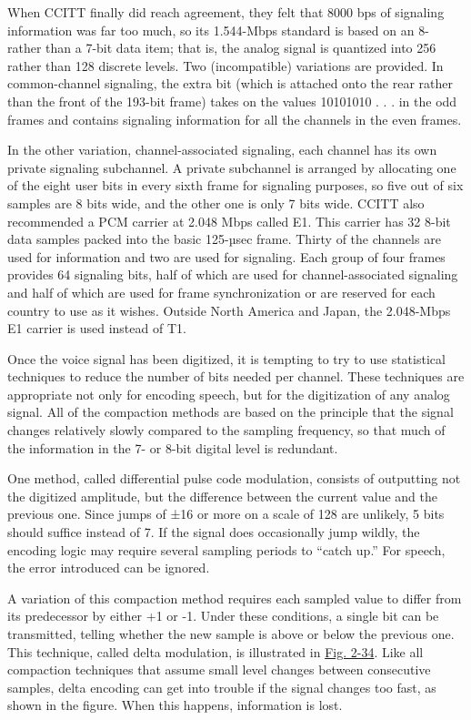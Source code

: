 When CCITT finally did reach agreement, they felt that 8000 bps of
signaling information was far too much, so its 1.544-Mbps standard is
based on an 8- rather than a 7-bit data item; that is, the analog signal
is quantized into 256 rather than 128 discrete levels. Two
(incompatible) variations are provided. In {common-channel signaling},
the extra bit (which is attached onto the rear rather than the front of
the 193-bit frame) takes on the values 10101010 . . . in the odd frames
and contains signaling information for all the channels in the even
frames.

In the other variation, {channel-associated signaling}, each channel has
its own private signaling subchannel. A private subchannel is arranged
by allocating one of the eight user bits in every sixth frame for
signaling purposes, so five out of six samples are 8 bits wide, and the
other one is only 7 bits wide. CCITT also recommended a PCM carrier at
2.048 Mbps called {E1}. This carrier has 32 8-bit data samples packed
into the basic 125{-}µsec frame. Thirty of the channels are used for
information and two are used for signaling. Each group of four frames
provides 64 signaling bits, half of which are used for
channel-associated signaling and half of which are used for frame
synchronization or are reserved for each country to use as it wishes.
Outside North America and Japan, the 2.048-Mbps E1 carrier is used
instead of T1.

Once the voice signal has been digitized, it is tempting to try to use
statistical techniques to reduce the number of bits needed per channel.
These techniques are appropriate not only for encoding speech, but for
the digitization of any analog signal. All of the compaction methods are
based on the principle that the signal changes relatively slowly
compared to the sampling frequency, so that much of the information in
the 7- or 8-bit digital level is redundant.

One method, called {differential pulse code modulation}, consists of
outputting not the digitized amplitude, but the difference between the
current value and the previous one. Since jumps of ±16 or more on a
scale of 128 are unlikely, 5 bits should suffice instead of 7. If the
signal does occasionally jump wildly, the encoding logic may require
several sampling periods to ``catch up.'' For speech, the error
introduced can be ignored.

A variation of this compaction method requires each sampled value to
differ from its predecessor by either +1 or -1. Under these conditions,
a single bit can be transmitted, telling whether the new sample is above
or below the previous one. This technique, called {delta modulation}, is
illustrated in
\protect\hyperlink{0130661023_ch02lev1sec5.htmlux5cux23ch02fig34}{Fig.
2-34}. Like all compaction techniques that assume small level changes
between consecutive samples, delta encoding can get into trouble if the
signal changes too fast, as shown in the figure. When this happens,
information is lost.

